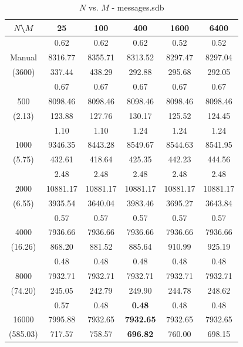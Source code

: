 \begin{table}[th]\small
\label{tab:messages.sdb}
\centering
\begin{tabular}{|c||c|c|c|c|c|}
\hline
$N$\textbackslash $M$& 25 & 100 & 400 & 1600 & 6400 \\ \hline \hline
       & 0.62    & 0.62    & 0.62    & 0.52    & 0.52  \\ 
Manual & 8316.77 & 8355.71 & 8313.52 & 8297.47 & 8297.04 \\
(3600) & 337.44  & 438.29  & 292.88  & 295.68  & 292.05 \\\hline
  & 0.67 & 0.67 & 0.67 & 0.67 & 0.67\\
500  & 8098.46 & 8098.46 & 8098.46 & 8098.46 & 8098.46\\ 
(2.13)  & 123.88 & 127.76 & 130.17 & 125.52 & 124.45\\ \hline 
  & 1.10 & 1.10 & 1.24 & 1.24 & 1.24\\ 
1000  & 9346.35 & 8443.28 & 8549.67 & 8544.63 & 8541.95\\ 
(5.75)  & 432.61 & 418.64 & 425.35 & 442.23 & 444.56\\ \hline 
  & 2.48 & 2.48 & 2.48 & 2.48 & 2.48\\ 
2000  & 10881.17 & 10881.17 & 10881.17 & 10881.17 & 10881.17\\ 
(6.55)  & 3935.54 & 3640.04 & 3983.46 & 3695.27 & 3643.84\\ \hline 
  & 0.57 & 0.57 & 0.57 & 0.57 & 0.57\\ 
4000  & 7936.66 & 7936.66 & 7936.66 & 7936.66 & 7936.66\\ 
(16.26)  & 868.20 & 881.52 & 885.64 & 910.99 & 925.19\\ \hline 
  & 0.48 & 0.48 & 0.48 & 0.48 & 0.48\\ 
8000  & 7932.71 & 7932.71 & 7932.71 & 7932.71 & 7932.71\\ 
(74.20)  & 245.05 & 242.79 & 249.90 & 244.78 & 248.62\\ \hline 
  & 0.57 & 0.48 & {\bf 0.48} & 0.48 & 0.48\\ 
16000  & 7995.88 & 7932.65 & {\bf 7932.65} & 7932.65 & 7932.65\\ 
(585.03)  & 717.57 & 758.57 & {\bf 696.82} & 760.00 & 698.15\\ \hline 
\end{tabular}
\caption{$N$ vs. $M$ - messages.sdb}
\end{table}

